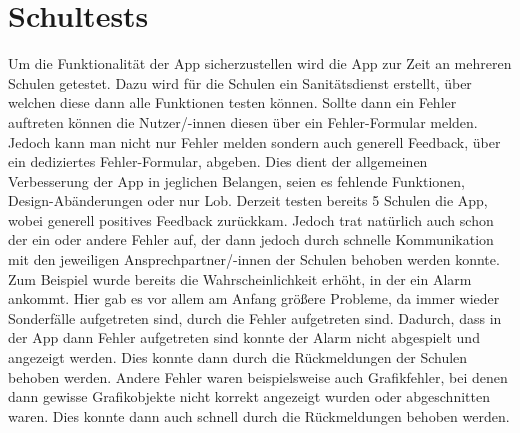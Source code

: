 \section{Schultests}
Um die Funktionalität der App sicherzustellen wird die App zur Zeit an mehreren Schulen getestet.
Dazu wird für die Schulen ein Sanitätsdienst erstellt, über welchen diese dann alle Funktionen testen können.
Sollte dann ein Fehler auftreten können die Nutzer/-innen diesen über ein Fehler-Formular melden. 
Jedoch kann man nicht nur Fehler melden sondern auch generell Feedback, über ein dediziertes Fehler-Formular, abgeben.
Dies dient der allgemeinen Verbesserung der App in jeglichen Belangen, seien es fehlende Funktionen, Design-Abänderungen oder nur Lob.
Derzeit testen bereits 5 Schulen die App, wobei generell positives Feedback zurückkam. Jedoch trat natürlich auch schon der ein oder andere Fehler auf, 
der dann jedoch durch schnelle Kommunikation mit den jeweiligen Ansprechpartner/-innen der Schulen behoben werden konnte.
Zum Beispiel wurde bereits die Wahrscheinlichkeit erhöht, in der ein Alarm ankommt. Hier gab es vor allem am Anfang größere Probleme, da immer wieder Sonderfälle aufgetreten sind, 
durch die Fehler aufgetreten sind. Dadurch, dass in der App dann Fehler aufgetreten sind konnte der Alarm nicht abgespielt und angezeigt werden.
Dies konnte dann durch die Rückmeldungen der Schulen behoben werden.
Andere Fehler waren beispielsweise auch Grafikfehler, bei denen dann gewisse Grafikobjekte nicht korrekt angezeigt wurden oder abgeschnitten waren. Dies konnte dann auch 
schnell durch die Rückmeldungen behoben werden.